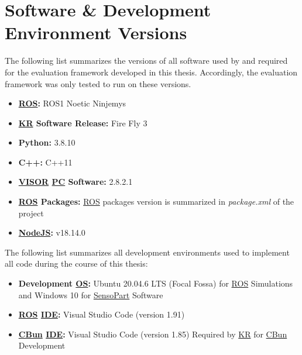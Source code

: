 \section{Software \& Development Environment Versions}
\label{sec:versions}

The following list summarizes the versions of all software used by and required for the
evaluation framework developed in this thesis. Accordingly, the evaluation framework
was only tested to run on these versions.

\begin{itemize}
    \item \textbf{\hyperref[acro:ROS]{ROS}:} ROS1 Noetic Ninjemys
    \item \textbf{\hyperref[acro:KR]{KR} Software Release:} Fire Fly 3
    \item \textbf{Python:} 3.8.10
    \item \textbf{C++:} C++11
    \item \textbf{\hyperref[acro:VISOR]{VISOR\textsuperscript{\textregistered}} \hyperref[acro:PC]{PC} Software:} 2.8.2.1
    \item \textbf{\hyperref[acro:ROS]{ROS} Packages:} \hyperref[acro:ROS]{ROS} packages version is summarized in \textit{package.xml} of the project
    \item \textbf{\hyperref[acro:JS]{NodeJS}:} v18.14.0
\end{itemize}

The following list summarizes all development environments used to implement all code
during the course of this thesis:

\begin{itemize}
    \item \textbf{Development \hyperref[acro:OS]{OS}:} Ubuntu 20.04.6 LTS (Focal Fossa) for \hyperref[acro:ROS]{ROS} Simulations and Windows 10 for \hyperref[acro:SensoPart]{SensoPart} Software
    \item \textbf{\hyperref[acro:ROS]{ROS} \hyperref[acro:IDE]{IDE}:} Visual Studio Code (version 1.91)
    \item \textbf{\hyperref[acro:CBun]{CBun} \hyperref[acro:IDE]{IDE}:} Visual Studio Code (version 1.85) Required by \hyperref[acro:KR]{KR} for \hyperref[acro:CBun]{CBun} Development
\end{itemize}

\newpage